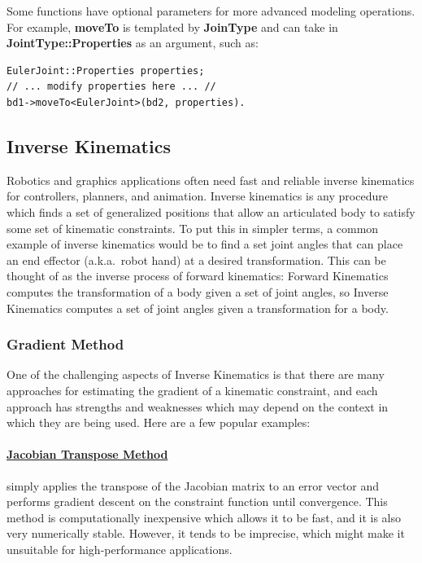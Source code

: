 Some functions have optional parameters for more advanced modeling
operations. For example, \textbf{moveTo} is templated by \textbf{JoinType} and
can take in \textbf{JointType::Properties} as an argument, such as:
\begin{lstlisting}
EulerJoint::Properties properties;
// ... modify properties here ... //
bd1->moveTo<EulerJoint>(bd2, properties).
\end{lstlisting}

\subsection{Inverse Kinematics}
\label{sec:ik}
Robotics and graphics applications often need fast and reliable inverse kinematics for controllers, planners, and animation. Inverse kinematics is any procedure which finds a set of generalized positions that allow an articulated body to satisfy some set of kinematic constraints. To put this in simpler terms, a common example of inverse kinematics would be to find a set joint angles that can place an end effector (a.k.a.\ robot hand) at a desired transformation. This can be thought of as the inverse process of forward kinematics: Forward Kinematics computes the transformation of a body given a set of joint angles, so Inverse Kinematics computes a set of joint angles given a transformation for a body.

\subsubsection{Gradient Method}
\label{sec:GradientMethod}

One of the challenging aspects of Inverse Kinematics is that there are many approaches for estimating the gradient of a kinematic constraint, and each approach has strengths and weaknesses which may depend on the context in which they are being used. Here are a few popular examples:

\paragraph{\underline{Jacobian Transpose Method}} simply applies the transpose of the Jacobian matrix to an error vector and performs gradient descent on the constraint function until convergence. This method is computationally inexpensive which allows it to be fast, and it is also very numerically stable. However, it tends to be imprecise, which might make it unsuitable for high-performance applications.

